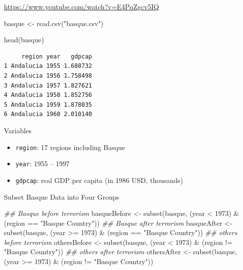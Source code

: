 \documentclass[
  letterpaper,
  DIV=11,
  numbers=noendperiod]{scrreprt}
\newenvironment{Shaded}{\begin{snugshade}}{\end{snugshade}}
\newcommand{\DecValTok}[1]{\textcolor[rgb]{0.68,0.00,0.00}{#1}}
\newcommand{\DocumentationTok}[1]{\textcolor[rgb]{0.37,0.37,0.37}{\textit{#1}}}
\newcommand{\FunctionTok}[1]{\textcolor[rgb]{0.28,0.35,0.67}{#1}}
\newcommand{\NormalTok}[1]{\textcolor[rgb]{0.00,0.23,0.31}{#1}}
\newcommand{\OtherTok}[1]{\textcolor[rgb]{0.00,0.23,0.31}{#1}}
\newcommand{\SpecialCharTok}[1]{\textcolor[rgb]{0.37,0.37,0.37}{#1}}
\newcommand{\StringTok}[1]{\textcolor[rgb]{0.13,0.47,0.30}{#1}}
\providecommand{\tightlist}{%
  \setlength{\itemsep}{0pt}\setlength{\parskip}{0pt}}\usepackage{longtable,booktabs,array}
\begin{document}
\url{https://www.youtube.com/watch?v=E4PqZgcv5IQ}

\begin{Shaded}
\begin{Highlighting}[]
\NormalTok{basque }\OtherTok{\textless{}{-}} \FunctionTok{read.csv}\NormalTok{(}\StringTok{"basque.csv"}\NormalTok{)}
\end{Highlighting}
\end{Shaded}

\begin{Shaded}
\begin{Highlighting}[]
\FunctionTok{head}\NormalTok{(basque)}
\end{Highlighting}
\end{Shaded}

\begin{verbatim}
     region year   gdpcap
1 Andalucia 1955 1.688732
2 Andalucia 1956 1.758498
3 Andalucia 1957 1.827621
4 Andalucia 1958 1.852756
5 Andalucia 1959 1.878035
6 Andalucia 1960 2.010140
\end{verbatim}

Variables

\begin{itemize}
\tightlist
\item
  \texttt{region}: 17 regions including Basque
\item
  \texttt{year}: 1955 -- 1997
\item
  \texttt{gdpcap}: real GDP per capita (in 1986 USD, thousands)
\end{itemize}

Subset Basque Data into Four Groups

\begin{Shaded}
\begin{Highlighting}[]
\DocumentationTok{\#\# Basque before terrorism}
\NormalTok{basqueBefore }\OtherTok{\textless{}{-}} \FunctionTok{subset}\NormalTok{(basque, (year }\SpecialCharTok{\textless{}} \DecValTok{1973}\NormalTok{) }\SpecialCharTok{\&}
\NormalTok{                            (region }\SpecialCharTok{==} \StringTok{"Basque Country"}\NormalTok{))}
\DocumentationTok{\#\# Basque after terrorism}
\NormalTok{basqueAfter }\OtherTok{\textless{}{-}} \FunctionTok{subset}\NormalTok{(basque, (year }\SpecialCharTok{\textgreater{}=} \DecValTok{1973}\NormalTok{) }\SpecialCharTok{\&}
\NormalTok{                           (region }\SpecialCharTok{==} \StringTok{"Basque Country"}\NormalTok{))}
\DocumentationTok{\#\# others before terrorism}
\NormalTok{othersBefore }\OtherTok{\textless{}{-}} \FunctionTok{subset}\NormalTok{(basque, (year }\SpecialCharTok{\textless{}} \DecValTok{1973}\NormalTok{) }\SpecialCharTok{\&}
\NormalTok{                            (region }\SpecialCharTok{!=} \StringTok{"Basque Country"}\NormalTok{))}
\DocumentationTok{\#\# others after terrorism}
\NormalTok{othersAfter }\OtherTok{\textless{}{-}} \FunctionTok{subset}\NormalTok{(basque, (year }\SpecialCharTok{\textgreater{}=} \DecValTok{1973}\NormalTok{) }\SpecialCharTok{\&}
\NormalTok{                           (region }\SpecialCharTok{!=} \StringTok{"Basque Country"}\NormalTok{))}
\end{Highlighting}
\end{Shaded}
\end{document}
